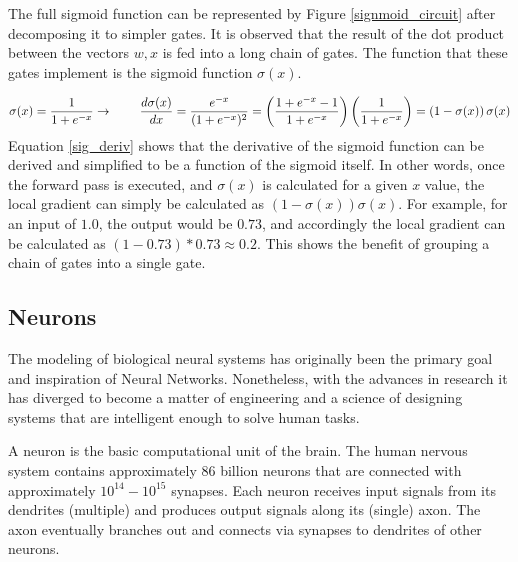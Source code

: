 The full sigmoid function can be represented by Figure \ref{signmoid_circuit} after decomposing it to simpler gates. It is observed that the result of the dot product between the vectors \(w,x\) is fed into a long chain of gates. The function that these gates implement is the sigmoid function \(\sigma(x)\).

\begin{equation}
\sigma(x) = \frac{1}{1+e^{-x}} \\\\
\rightarrow \hspace{0.3in} \frac{d\sigma(x)}{dx} = \frac{e^{-x}}{(1+e^{-x})^2} = \left( \frac{1 + e^{-x} - 1}{1 + e^{-x}} \right) \left( \frac{1}{1+e^{-x}} \right) 
= \left( 1 - \sigma(x) \right) \sigma(x)
\label{sig_deriv}
\end{equation}
Equation \ref{sig_deriv} shows that the derivative of the sigmoid function can be derived and simplified to be a function of the sigmoid itself. In other words, once the forward pass is executed, and \(\sigma(x)\) is calculated for a given \(x\) value, the local gradient can simply be calculated as \(( 1 - \sigma(x)) \sigma(x)\). For example, for an input of \(1.0\), the output would be \(0.73\), and accordingly the local gradient can be calculated as \((1 - 0.73) * 0.73 \approx 0.2\). This shows the benefit of grouping a chain of gates into a single gate.

\subsection{Neurons}
The modeling of biological neural systems has originally been the primary goal and inspiration of Neural Networks. Nonetheless, with the advances in research it has diverged to become a matter of engineering and a science of designing systems that are intelligent enough to solve human tasks.



A neuron is the basic computational unit of the brain. The human nervous system contains approximately 86 billion neurons that are connected with approximately \(10^{14} - 10^{15}\) synapses. Each neuron receives input signals from its dendrites (multiple) and produces output signals along its (single) axon. The axon eventually branches out and connects via synapses to dendrites of other neurons.

